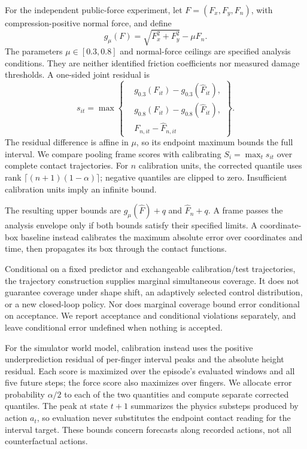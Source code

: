\documentclass[letterpaper,10pt,conference]{ieeeconf}
\begin{document}
For the independent public-force experiment, let $F=(F_x,F_y,F_n)$, with
compression-positive normal force, and define
\begin{equation}
g_\mu(F)=\sqrt{F_x^2+F_y^2}-\mu F_n.
\label{eq:contact-function}
\end{equation}
The parameters $\mu\in[0.3,0.8]$ and normal-force ceilings are specified
analysis conditions. They are neither identified friction coefficients nor
measured damage thresholds. A one-sided joint residual is
\begin{equation}
s_{it}=\max\left\{
\begin{aligned}
&g_{0.3}(F_{it})-g_{0.3}(\widehat F_{it}),\\
&g_{0.8}(F_{it})-g_{0.8}(\widehat F_{it}),\\
&F_{n,it}-\widehat F_{n,it}
\end{aligned}
\right\}.
\label{eq:residual}
\end{equation}
The residual difference is affine in $\mu$, so its endpoint maximum bounds
the full interval. We compare pooling frame scores with calibrating
$S_i=\max_t s_{it}$ over complete contact trajectories. For $n$ calibration
units, the corrected quantile uses rank $\lceil(n+1)(1-\alpha)\rceil$;
negative quantiles are clipped to zero. Insufficient calibration units imply
an infinite bound.

The resulting upper bounds are $g_\mu(\widehat F)+q$ and $\widehat F_n+q$.
A frame passes the analysis envelope only if both bounds satisfy their
specified limits. A coordinate-box baseline instead calibrates the maximum
absolute error over coordinates and time, then propagates its box through the
contact functions.

Conditional on a fixed predictor and exchangeable calibration/test trajectories,
the trajectory construction supplies marginal simultaneous coverage. It does
not guarantee coverage under shape shift, an adaptively selected control
distribution, or a new closed-loop policy. Nor does marginal coverage bound
error conditional on acceptance. We report acceptance and conditional
violations separately, and leave conditional error undefined when nothing is
accepted.

For the simulator world model, calibration instead uses the positive underprediction residual of per-finger interval peaks and the absolute height residual. Each score is maximized over the episode's evaluated windows and all five future steps; the force score also maximizes over fingers. We allocate error probability $\alpha/2$ to each of the two quantities and compute separate corrected quantiles. The peak at state $t+1$ summarizes the physics substeps produced by action $a_t$, so evaluation never substitutes the endpoint contact reading for the interval target. These bounds concern forecasts along recorded actions, not all counterfactual actions.
\end{document}
